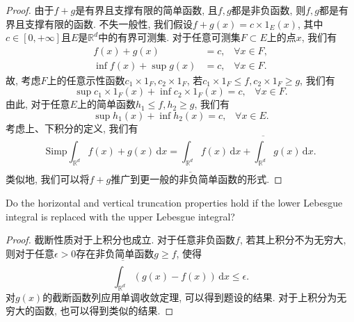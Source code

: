 \documentclass[reqno,a4paper,10pt]{amsart}
\newcommand\dif{\,\mathrm{d}}
\newcommand\Rnum{\mathbb{R}}
\begin{document}
\begin{proof}
    由于$f+g$是有界且支撑有限的简单函数, 且$f,g$都是非负函数, 则$f,g$都是有界且支撑有限的函数. 不失一般性, 我们假设$f+g(x)=c\times 1_E(x)$, 其中$c\in[0,+\infty]$且$E$是$\Rnum^d$中的有界可测集. 对于任意可测集$F\subset E$上的点$x$, 我们有
    \begin{equation*}
        \begin{split}
            f(x)+g(x)&=c, \;\;\;\forall x\in F,\\
            \inf f(x)+\sup g(x)&=c, \;\;\;\forall x\in F. 
        \end{split}
    \end{equation*}
    故, 考虑$F$上的任意示性函数$c_1\times 1_F,c_2\times 1_F$, 若$c_1\times 1_F\leq f, c_2\times 1_F\geq g$, 我们有
    \begin{equation*}
        \sup c_1\times 1_F(x)+\inf c_2\times 1_F(x)=c,\;\;\; \forall x\in F.
    \end{equation*}
    由此, 对于任意$E$上的简单函数$h_1\leq f, h_2\geq g$, 我们有
    \begin{equation*}
        \sup h_1(x)+\inf h_2(x)=c,\;\;\; \forall x\in E.
    \end{equation*}
    考虑上、下积分的定义, 我们有
    \begin{equation*}
        \mathrm{Simp}\int_{\Rnum^d} f(x)+g(x)\dif x=\underline{\int_{\Rnum^d}}f(x)\dif x+\overline{\int_{\Rnum^d}}g(x)\dif x.
    \end{equation*}
    类似地, 我们可以将$f+g$推广到更一般的非负简单函数的形式.
\end{proof}
Do the horizontal and vertical truncation properties hold if the lower Lebesgue integral is replaced with the upper Lebesgue integral?
\begin{proof}
    截断性质对于上积分也成立. 对于任意非负函数$f$, 若其上积分不为无穷大, 则对于任意$\epsilon>0$存在非负简单函数$g\geq f$, 使得
    \begin{equation}
        \overline{\int_{\Rnum^d}} (g(x)-f(x))\dif x\leq \epsilon.
    \end{equation}
    对$g(x)$的截断函数列应用单调收敛定理, 可以得到题设的结果. 对于上积分为无穷大的函数, 也可以得到类似的结果.
\end{proof}
\end{document}
